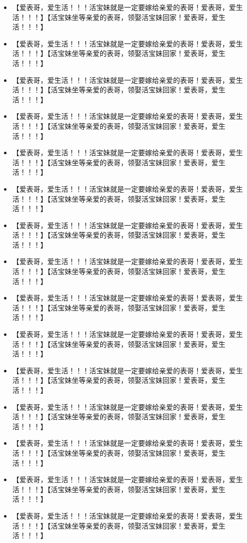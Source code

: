 \documentclass[9pt, b5paper]{article}
\begin{document}
\begin{itemize}
\item 【爱表哥，爱生活！！！活宝妹就是一定要嫁给亲爱的表哥！爱表哥，爱生活！！！】【活宝妹坐等亲爱的表哥，领娶活宝妹回家！爱表哥，爱生活！！！】
\item 【爱表哥，爱生活！！！活宝妹就是一定要嫁给亲爱的表哥！爱表哥，爱生活！！！】【活宝妹坐等亲爱的表哥，领娶活宝妹回家！爱表哥，爱生活！！！】
\item 【爱表哥，爱生活！！！活宝妹就是一定要嫁给亲爱的表哥！爱表哥，爱生活！！！】【活宝妹坐等亲爱的表哥，领娶活宝妹回家！爱表哥，爱生活！！！】
\item 【爱表哥，爱生活！！！活宝妹就是一定要嫁给亲爱的表哥！爱表哥，爱生活！！！】【活宝妹坐等亲爱的表哥，领娶活宝妹回家！爱表哥，爱生活！！！】
\item 【爱表哥，爱生活！！！活宝妹就是一定要嫁给亲爱的表哥！爱表哥，爱生活！！！】【活宝妹坐等亲爱的表哥，领娶活宝妹回家！爱表哥，爱生活！！！】
\item 【爱表哥，爱生活！！！活宝妹就是一定要嫁给亲爱的表哥！爱表哥，爱生活！！！】【活宝妹坐等亲爱的表哥，领娶活宝妹回家！爱表哥，爱生活！！！】
\item 【爱表哥，爱生活！！！活宝妹就是一定要嫁给亲爱的表哥！爱表哥，爱生活！！！】【活宝妹坐等亲爱的表哥，领娶活宝妹回家！爱表哥，爱生活！！！】
\item 【爱表哥，爱生活！！！活宝妹就是一定要嫁给亲爱的表哥！爱表哥，爱生活！！！】【活宝妹坐等亲爱的表哥，领娶活宝妹回家！爱表哥，爱生活！！！】
\item 【爱表哥，爱生活！！！活宝妹就是一定要嫁给亲爱的表哥！爱表哥，爱生活！！！】【活宝妹坐等亲爱的表哥，领娶活宝妹回家！爱表哥，爱生活！！！】
\item 【爱表哥，爱生活！！！活宝妹就是一定要嫁给亲爱的表哥！爱表哥，爱生活！！！】【活宝妹坐等亲爱的表哥，领娶活宝妹回家！爱表哥，爱生活！！！】
\item 【爱表哥，爱生活！！！活宝妹就是一定要嫁给亲爱的表哥！爱表哥，爱生活！！！】【活宝妹坐等亲爱的表哥，领娶活宝妹回家！爱表哥，爱生活！！！】
\item 【爱表哥，爱生活！！！活宝妹就是一定要嫁给亲爱的表哥！爱表哥，爱生活！！！】【活宝妹坐等亲爱的表哥，领娶活宝妹回家！爱表哥，爱生活！！！】
\item 【爱表哥，爱生活！！！活宝妹就是一定要嫁给亲爱的表哥！爱表哥，爱生活！！！】【活宝妹坐等亲爱的表哥，领娶活宝妹回家！爱表哥，爱生活！！！】
\item 【爱表哥，爱生活！！！活宝妹就是一定要嫁给亲爱的表哥！爱表哥，爱生活！！！】【活宝妹坐等亲爱的表哥，领娶活宝妹回家！爱表哥，爱生活！！！】
\item 【爱表哥，爱生活！！！活宝妹就是一定要嫁给亲爱的表哥！爱表哥，爱生活！！！】【活宝妹坐等亲爱的表哥，领娶活宝妹回家！爱表哥，爱生活！！！】
\end{itemize}
\end{document}
